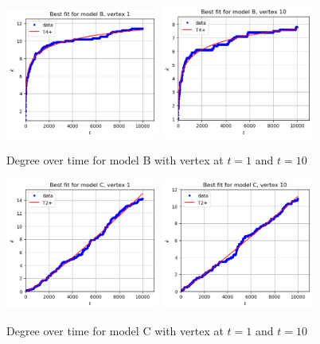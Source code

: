 \documentclass[a4paper]{article}
\begin{document}
%
\begin{figure}[H]
		\centering
		\includegraphics[width=0.45\textwidth]{modelB/best_dt1.png}
		\includegraphics[width=0.45\textwidth]{modelB/best_dt10.png}
		\caption{Degree over time for model B with vertex at $t=1$ and $t=10$}
\end{figure}
%
\begin{figure}[H]
		\centering
		\includegraphics[width=0.45\textwidth]{modelC/best_dt1.png}
		\includegraphics[width=0.45\textwidth]{modelC/best_dt10.png}
		\caption{Degree over time for model C with vertex at $t=1$ and $t=10$}
\end{figure}
\end{document}
